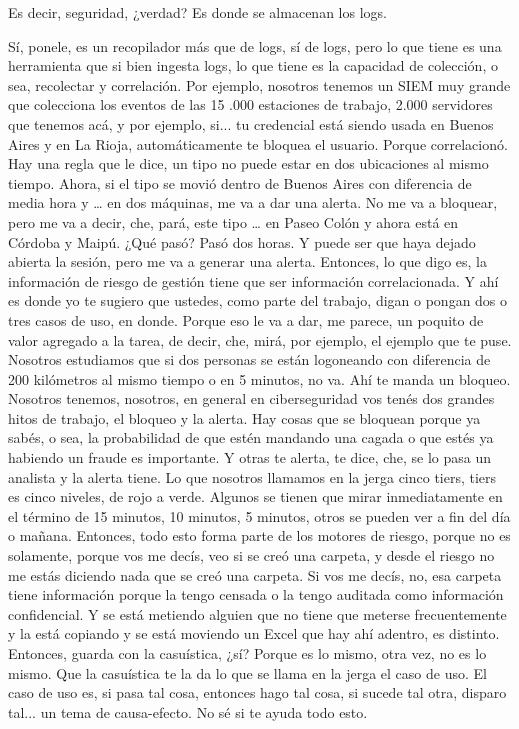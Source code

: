 \begin{description}[leftmargin=0cm, labelsep=0.5cm]
    \item[\textbf{MUNTAABSKI FEDERICO:}] Es decir, seguridad, ¿verdad? Es donde se almacenan los logs.

    \item[\textbf{PITA GUILLERMO:}] Sí, ponele, es un recopilador más que de logs, sí de logs, pero lo que tiene es una herramienta que si bien ingesta logs, lo que tiene es la capacidad de colección, o sea, recolectar y correlación. Por ejemplo, nosotros tenemos un SIEM muy grande que colecciona los eventos de las 15 .000 estaciones de trabajo, 2.000 servidores que tenemos acá, y por ejemplo, si... tu credencial está siendo usada en Buenos Aires y en La Rioja, automáticamente te bloquea el usuario. Porque correlacionó. Hay una regla que le dice, un tipo no puede estar en dos ubicaciones al mismo tiempo. Ahora, si el tipo se movió dentro de Buenos Aires con diferencia de media hora y … en dos máquinas, me va a dar una alerta. No me va a bloquear, pero me va a decir, che, pará, este tipo … en Paseo Colón y ahora está en Córdoba y Maipú. ¿Qué pasó? Pasó dos horas. Y puede ser que haya dejado abierta la sesión, pero me va a generar una alerta. Entonces, lo que digo es, la información de riesgo de gestión tiene que ser información correlacionada. Y ahí es donde yo te sugiero que ustedes, como parte del trabajo, digan o pongan dos o tres casos de uso, en donde. Porque eso le va a dar, me parece, un poquito de valor agregado a la tarea, de decir, che, mirá, por ejemplo, el ejemplo que te puse. Nosotros estudiamos que si dos personas se están logoneando con diferencia de 200 kilómetros al mismo tiempo o en 5 minutos, no va. Ahí te manda un bloqueo. Nosotros tenemos, nosotros, en general en ciberseguridad vos tenés dos grandes hitos de trabajo, el bloqueo y la alerta. Hay cosas que se bloquean porque ya sabés, o sea, la probabilidad de que estén mandando una cagada o que estés ya habiendo un fraude es importante. Y otras te alerta, te dice, che, se lo pasa un analista y la alerta tiene. Lo que nosotros llamamos en la jerga cinco tiers, tiers es cinco niveles, de rojo a verde. Algunos se tienen que mirar inmediatamente en el término de 15 minutos, 10 minutos, 5 minutos, otros se pueden ver a fin del día o mañana. Entonces, todo esto forma parte de los motores de riesgo, porque no es solamente, porque vos me decís, veo si se creó una carpeta, y desde el riesgo no me estás diciendo nada que se creó una carpeta. Si vos me decís, no, esa carpeta tiene información porque la tengo censada o la tengo auditada como información confidencial. Y se está metiendo alguien que no tiene que meterse frecuentemente y la está copiando y se está moviendo un Excel que hay ahí adentro, es distinto. Entonces, guarda con la casuística, ¿sí? Porque es lo mismo, otra vez, no es lo mismo. Que la casuística te la da lo que se llama en la jerga el caso de uso. El caso de uso es, si pasa tal cosa, entonces hago tal cosa, si sucede tal otra, disparo tal... un tema de causa-efecto. No sé si te ayuda todo esto.


\end{description}

